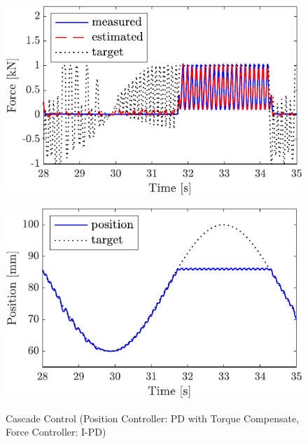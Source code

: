 \begin{figure}[t]
    \begin{minipage}{\minipageratio\hsize}
    \centering
        \includegraphics[keepaspectratio, scale = \minifigscale]{contents/IntegrationControl/figure/SECASQ/crop-FBcsqtch_IPD_trq_force.pdf}
        \label{fig5:crop-FBcsqtch_IPD_trq_force}
    \end{minipage}
    \begin{minipage}{\minipageratio\hsize}
    \centering
        \includegraphics[keepaspectratio, scale = \minifigscale]{contents/IntegrationControl/figure/SECASQ/crop-FBcsqtch_IPD_trq_pos.pdf}
        \label{fig5:crop-FBcsqtch_IPD_trq_pos}
    \end{minipage}
    \caption{Cascade Control (Position Controller: PD with Torque Compensate, Force Controller: I-PD)}  
    \label{fig5:crop-FBcsqtch_IPD_trq}
\end{figure}

